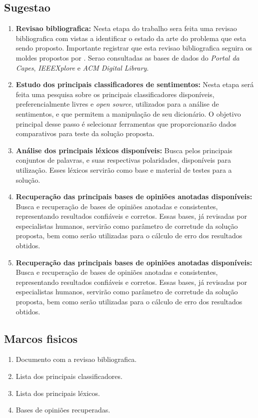 \documentclass[a4paper,11pt]{article}
\begin{document}
\subsection{Sugestao}
\begin{enumerate}[D1.]
\item{\textbf{Revisao bibliografica:} Nesta etapa do trabalho sera feita uma revisao bibliografica com vistas a identificar o estado da arte do problema que esta sendo proposto. Importante registrar que esta revisao bibliografica seguira os moldes propostos por \cite{Kitchenham2004}}. Serao consultadas as bases de dados do \emph{Portal da Capes}, \emph{IEEEXplore} e \emph{ACM Digital Library}.

\item{\textbf{Estudo dos principais classificadores de sentimentos:}}
Nesta etapa será feita uma pesquisa sobre os principais classificadores disponíveis, preferencialmente livres e \emph{open source}, utilizados para a análise de sentimentos, e que permitem a manipulação de seu dicionário. O objetivo principal desse passo é selecionar ferramentas que proporcionarão dados comparativos para teste da solução proposta.

\item{\textbf{Análise dos principais léxicos disponíveis:}}
Busca pelos principais conjuntos de palavras, e suas respectivas polaridades, disponíveis para utilização. Esses léxicos servirão como base e material de testes para a solução.

\item{\textbf{Recuperação das principais bases de opiniões anotadas disponíveis:}}
Busca e recuperação de bases de opiniões anotadas e consistentes, representando resultados confiáveis e corretos. Essas bases, já revisadas por especialistas humanos, servirão como parâmetro de corretude da solução proposta, bem como serão utilizadas para o cálculo de erro dos resultados obtidos.

\item{\textbf{Recuperação das principais bases de opiniões anotadas disponíveis:}}
Busca e recuperação de bases de opiniões anotadas e consistentes, representando resultados confiáveis e corretos. Essas bases, já revisadas por especialistas humanos, servirão como parâmetro de corretude da solução proposta, bem como serão utilizadas para o cálculo de erro dos resultados obtidos.
\end{enumerate}

\subsection{Marcos fisicos}
\begin{enumerate}[D1.]
\item{Documento com a revisao bibliografica.}
\item{Lista dos principais classificadores.}
\item{Lista dos principais léxicos.}
\item{Bases de opiniões recuperadas.}
\end{enumerate}
\end{document}

